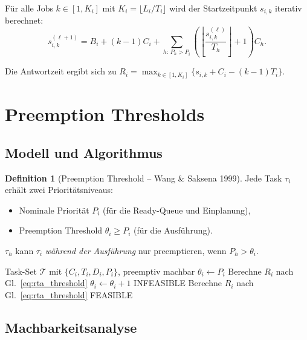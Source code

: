 ﻿\documentclass[a4paper,12pt]{report}
\theoremstyle{definition}
\newtheorem{definition}{Definition}[chapter]
\begin{document}
Für alle Jobs $k \in [1, K_i]$ mit $K_i = \lfloor L_i/T_i \rfloor$ wird der Startzeitpunkt
$s_{i,k}$ iterativ berechnet:
\[
	s_{i,k}^{(\ell+1)} = B_i + (k-1)C_i + \sum_{h:\,P_h > P_i} \left(\left\lfloor \frac{s_{i,k}^{(\ell)}}{T_h} \right\rfloor + 1\right) C_h.
\]

Die Antwortzeit ergibt sich zu $R_i = \max_{k \in [1,K_i]}\{s_{i,k} + C_i - (k-1)T_i\}$.

\section{Preemption Thresholds}

\subsection{Modell und Algorithmus}

\begin{definition}[Preemption Threshold -- Wang \& Saksena 1999]
	Jede Task $\tau_i$ erhält zwei Prioritätsniveaus:
	\begin{itemize}
		\item Nominale Priorität $P_i$ (für die Ready-Queue und Einplanung),
		\item Preemption Threshold $\theta_i \geq P_i$ (für die Ausführung).
	\end{itemize}
	$\tau_h$ kann $\tau_i$ \emph{während der Ausführung} nur preemptieren, wenn
	$P_h > \theta_i$.
\end{definition}

\begin{algorithm}[H]
	\caption{Assign Minimum Preemption Thresholds (Wang \& Saksena)}
	\begin{algorithmic}[1]
		\Require Task-Set $\mathcal{T}$ mit $\{C_i, T_i, D_i, P_i\}$, preemptiv machbar
		 
		\State $\theta_i \leftarrow P_i$
		\State Berechne $R_i$ nach Gl.~\eqref{eq:rta_threshold}
		\State $\theta_i \leftarrow \theta_i + 1$
		 \Return INFEASIBLE \EndIf
		\State Berechne $R_i$ nach Gl.~\eqref{eq:rta_threshold}
		\EndWhile
		\EndFor
		\State \Return FEASIBLE
	\end{algorithmic}
\end{algorithm}

\subsection{Machbarkeitsanalyse}
\end{document}
